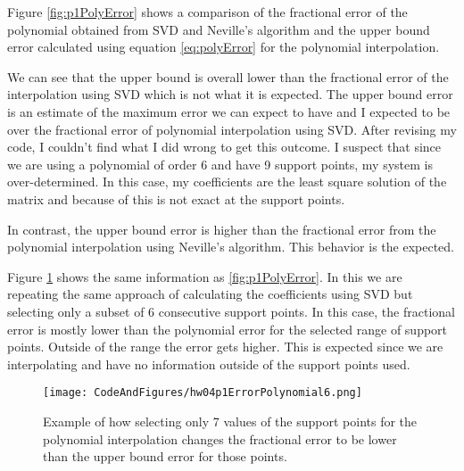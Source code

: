 Figure \ref{fig:p1PolyError} shows a comparison of the fractional error of the polynomial obtained from SVD and Neville's algorithm and the upper bound error calculated using equation \ref{eq:polyError} for the polynomial interpolation.

We can see that the upper bound is overall lower than the fractional error of the interpolation using SVD which is not what it is expected. The upper bound error is an estimate of the maximum error we can expect to have and I expected to be over the fractional error of polynomial interpolation using SVD. After revising my code, I couldn't find what I did wrong to get this outcome. I suspect that since we are using a polynomial of order 6 and have 9 support points, my system is over-determined. In this case, my coefficients are the least square solution of the matrix and because of this is not exact at the support points.

In contrast, the upper bound error is higher than the fractional error from the polynomial interpolation using Neville's algorithm. This behavior is the expected. 

Figure \ref{fig:p1PolyError6} shows the same information as \ref{fig:p1PolyError}. In this we are repeating the same approach of calculating the coefficients using SVD but selecting only a subset of 6 consecutive support points. In this case, the fractional error is mostly lower than the polynomial error for the selected range of support points. Outside of the range the error gets higher. This is expected since we are interpolating and have no information outside of the support points used.

\begin{figure}
    \centering
    \texttt{[image: CodeAndFigures/hw04p1ErrorPolynomial6.png]}
    \caption{Example of how selecting only 7 values of the support points for the polynomial interpolation changes the fractional error to be lower than the upper bound error for those points.}
    \label{fig:p1PolyError6}
\end{figure}
